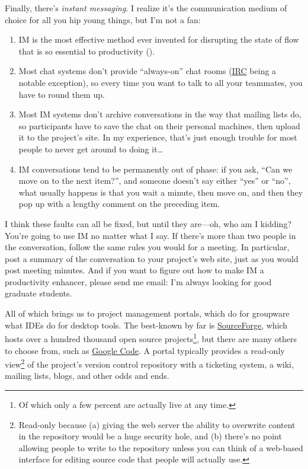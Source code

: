 \documentclass{report}
\begin{document}
Finally, there's \emph{instant messaging}.  I realize it's the
communication medium of choice for all you hip young things, but I'm
not a fan:

\begin{enumerate}

  \item IM is the most effective method ever invented for disrupting
  the state of flow that is so essential to productivity
  ().

  \item Most chat systems don't provide ``always-on'' chat rooms
  (\url{IRC} being a notable exception), so every time you want to
  talk to all your teammates, you have to round them up.

  \item Most IM systems don't archive conversations in the way that
  mailing lists do, so participants have to save the chat on their
  personal machines, then upload it to the project's site.  In my
  experience, that's just enough trouble for most people to never get
  around to doing it{\ldots}

  \item IM conversations tend to be permanently out of phase: if you
  ask, ``Can we move on to the next item?'', and someone doesn't say
  either ``yes'' or ``no'', what usually happens is that you wait a
  minute, then move on, and then they pop up with a lengthy comment on
  the preceding item.

\end{enumerate}

I think these faults can all be fixed, but until they are---oh, who am
I kidding?  You're going to use IM no matter what I say.  If there's
more than two people in the conversation, follow the same rules you
would for a meeting.  In particular, post a summary of the
conversation to your project's web site, just as you would post
meeting minutes.  And if you want to figure out how to make IM a
productivity enhancer, please send me email: I'm always looking for
good graduate students.


All of which brings us to project management portals, which do for
groupware what IDEs do for desktop tools.  The best-known by far is
\url{SourceForge}, which hosts over a hundred thousand open source
projects\footnote{Of which only a few percent are actually live at any
time.}, but there are many others to choose from, such as \url{Google
Code}.  A portal typically provides a read-only
view\footnote{Read-only because (a) giving the web server the ability
to overwrite content in the repository would be a huge security hole,
and (b) there's no point allowing people to write to the repository
unless you can think of a web-based interface for editing source code
that people will actually use.} of the project's version control
repository with a ticketing system, a wiki, mailing lists, blogs, and
other odds and ends.
\end{document}
